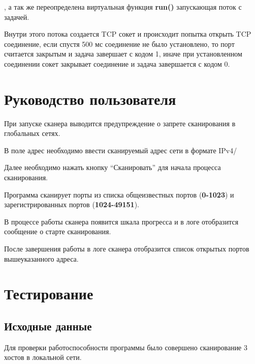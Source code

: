 , а так же переопределена виртуальная функция \textbf{run()} запускающая
поток с задачей.

Внутри этого потока создается TCP сокет и происходит попытка открыть TCP
соединение, если спустя 500 мс соединение не было установлено, то порт
считается закрытым и задача завершает с кодом 1, иначе при установленном
соединении сокет закрывает соединение и задача завершается с кодом 0.

\hypertarget{ux440ux443ux43aux43eux432ux43eux434ux441ux442ux432ux43e-ux43fux43eux43bux44cux437ux43eux432ux430ux442ux435ux43bux44f}{%
\section{Руководство
пользователя}\label{ux440ux443ux43aux43eux432ux43eux434ux441ux442ux432ux43e-ux43fux43eux43bux44cux437ux43eux432ux430ux442ux435ux43bux44f}}

При запуске сканера выводится предупреждение о запрете сканирования в
глобальных сетях.

В поле адрес необходимо ввести сканируемый адрес сети в формате IPv4/

Далее необходимо нажать кнопку ``Сканировать'' для начала процесса
сканирования.

Программа сканирует порты из списка общеизвестных портов
(\textbf{0-1023}) и зарегистрированных портов (\textbf{1024-49151}).

В процессе работы сканера появится шкала прогресса и в логе отобразится
сообщение о старте сканирования.

После завершения работы в логе сканера отобразится список открытых
портов вышеуказанного адреса.

\hypertarget{ux442ux435ux441ux442ux438ux440ux43eux432ux430ux43dux438ux435}{%
\section{Тестирование}\label{ux442ux435ux441ux442ux438ux440ux43eux432ux430ux43dux438ux435}}

\hypertarget{ux438ux441ux445ux43eux434ux43dux44bux435-ux434ux430ux43dux43dux44bux435}{%
\subsection{Исходные
данные}\label{ux438ux441ux445ux43eux434ux43dux44bux435-ux434ux430ux43dux43dux44bux435}}

Для проверки работоспособности программы было совершено сканирование 3
хостов в локальной сети.

